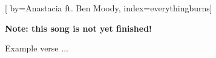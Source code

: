 
[%
    by={Anastacia ft. Ben Moody},
    index={everythingburns}]


    \label{everythingburns}

    \textbf{Note: this song is not yet finished!}

    \beginverse
        Example verse ...
    \endverse
\endsong
